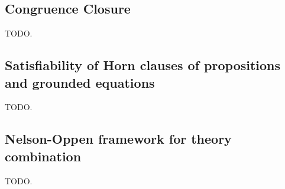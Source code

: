 \subsection{Congruence Closure}

TODO.

\subsection{Satisfiability of Horn clauses of propositions and grounded equations}

TODO.

\subsection{Nelson-Oppen framework for theory combination}


TODO.

